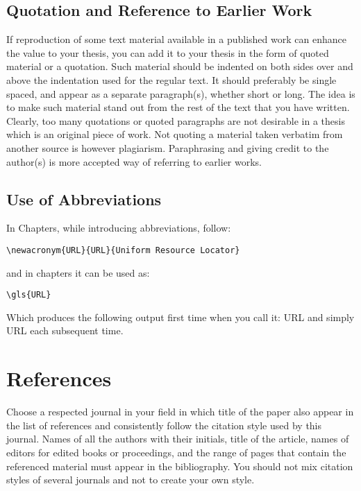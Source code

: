 \subsection{Quotation and Reference to Earlier Work}

If reproduction of some text material available in a published work can enhance the value to your thesis, you can add it to your thesis in the form of quoted material or a quotation. Such material should be indented on both sides over and above the indentation used for the regular text. It should preferably be single spaced, and appear as a separate paragraph(s), whether short or long. The idea is to make such material stand out from the rest of the text that you have written. Clearly, too many quotations or quoted paragraphs are not desirable in a thesis which is an original piece of work. Not quoting a material taken verbatim from another source is however plagiarism. Paraphrasing and giving credit to the author(s) is more accepted way of referring to earlier works. 

\subsection{Use of Abbreviations}
In Chapters, while introducing abbreviations, follow:

\begin{verbatim}
\newacronym{URL}{URL}{Uniform Resource Locator}
\end{verbatim}

and in chapters it can be used as:

\begin{verbatim}
\gls{URL}
\end{verbatim}

Which produces the following output first time when you call it: \gls{URL} and simply \gls{URL} each subsequent time.

\section{References}
Choose a respected journal in your field in which title of the paper also appear in the list of references and consistently follow the citation style used by this journal. Names of all the authors with their initials, title of the article, names of editors for edited books or proceedings, and the range of pages that contain the referenced material must appear in the bibliography. You should not mix citation styles of several journals and not to create your own style. 

